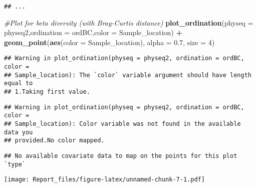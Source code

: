 \documentclass[]{article}
\newenvironment{Shaded}{\begin{snugshade}}{\end{snugshade}}
\newcommand{\CommentTok}[1]{\textcolor[rgb]{0.56,0.35,0.01}{\textit{#1}}}
\newcommand{\DataTypeTok}[1]{\textcolor[rgb]{0.13,0.29,0.53}{#1}}
\newcommand{\DecValTok}[1]{\textcolor[rgb]{0.00,0.00,0.81}{#1}}
\newcommand{\FloatTok}[1]{\textcolor[rgb]{0.00,0.00,0.81}{#1}}
\newcommand{\KeywordTok}[1]{\textcolor[rgb]{0.13,0.29,0.53}{\textbf{#1}}}
\newcommand{\NormalTok}[1]{#1}
\newcommand{\OperatorTok}[1]{\textcolor[rgb]{0.81,0.36,0.00}{\textbf{#1}}}
\newcommand{\StringTok}[1]{\textcolor[rgb]{0.31,0.60,0.02}{#1}}
\begin{document}
\begin{verbatim}
## ...
\end{verbatim}

\begin{Shaded}
\begin{Highlighting}[]
\CommentTok{#Plot for beta diversity (with Bray-Curtis distance)}
\KeywordTok{plot_ordination}\NormalTok{(}\DataTypeTok{physeq =}\NormalTok{ physeq2,}\DataTypeTok{ordination =}\NormalTok{ ordBC,}\DataTypeTok{color =}\NormalTok{ Sample_location) }\OperatorTok{+}\StringTok{ }\KeywordTok{geom_point}\NormalTok{(}\KeywordTok{aes}\NormalTok{(}\DataTypeTok{color =}\NormalTok{ Sample_location), }\DataTypeTok{alpha =} \FloatTok{0.7}\NormalTok{, }\DataTypeTok{size =} \DecValTok{4}\NormalTok{)}
\end{Highlighting}
\end{Shaded}

\begin{verbatim}
## Warning in plot_ordination(physeq = physeq2, ordination = ordBC, color =
## Sample_location): The `color` variable argument should have length equal to
## 1.Taking first value.
\end{verbatim}

\begin{verbatim}
## Warning in plot_ordination(physeq = physeq2, ordination = ordBC, color =
## Sample_location): Color variable was not found in the available data you
## provided.No color mapped.
\end{verbatim}

\begin{verbatim}
## No available covariate data to map on the points for this plot `type`
\end{verbatim}

\texttt{[image: Report\_files/figure-latex/unnamed-chunk-7-1.pdf]}

\begin{Shaded}
\end{Shaded}
\end{document}
